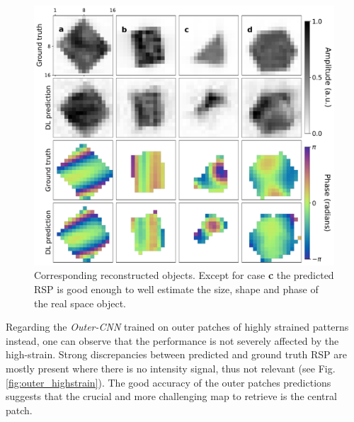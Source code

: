 \begin{figure}[H]
    \centering
    \includegraphics[width=\textwidth]{figures/Phasing/central_patch_highstrain_obj.pdf}
    \caption{Corresponding reconstructed objects. Except for case \textbf{c} the predicted RSP is good enough to well 
    estimate the size, shape and phase of the real space object. }
    \label{fig:central_highstrain_obj}
\end{figure}

Regarding the \textit{Outer-CNN} trained on outer patches of highly strained patterns instead, one can observe that 
the performance is not severely affected by the 
high-strain. Strong discrepancies between predicted and ground truth RSP are mostly present where there is no intensity signal, 
thus not relevant (see Fig.\ref{fig:outer_highstrain}). The good accuracy of the outer patches predictions suggests 
that the crucial and more challenging map to retrieve is the central patch. 

